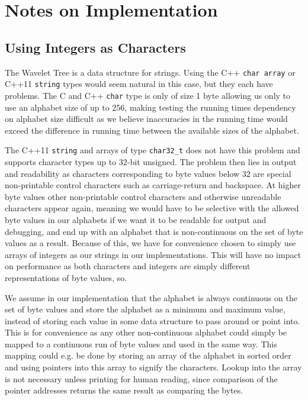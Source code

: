\section{Notes on Implementation}

\subsection{Using Integers as Characters}
\label{sec:UsingIntAsChar}
The Wavelet Tree is a data structure for strings. 
Using the C++ \texttt{char array} or C++11 \texttt{string} types would seem natural in this case, but they each have problems.
The C and C++ \texttt{char} type is only of size 1 byte allowing us only to use an alphabet size of up to 256, making testing the running times dependency on alphabet size difficult as we believe inaccuracies in the running time would exceed the difference in running time between the available sizes of the alphabet.

The C++11 \texttt{string} and arrays of type \texttt{char32\_t} does not have this problem and supports character types up to 32-bit unsigned. 
The problem then lies in output and readability as characters corresponding to byte values below 32 are special non-printable control characters such as carriage-return and backspace. 
At higher byte values other non-printable control characters and otherwise unreadable characters appear again, meaning we would have to be selective with the allowed byte values in our alphabets if we want it to be readable for output and debugging, and end up with an alphabet that is non-continuous on the set of byte values as a result.
Because of this, we have for convenience chosen to simply use arrays of integers as our strings in our implementations.
This will have no impact on performance as both characters and integers are simply different representations of byte values, so.

We assume in our implementation that the alphabet is always continuous on the set of byte values and store the alphabet as a minimum and maximum value, instead of storing each value in some data structure to pass around or point into.
This is for convenience as any other non-continuous alphabet could simply be mapped to a continuous run of byte values and used in the same way. 
This mapping could e.g. be done by storing an array of the alphabet in sorted order and using pointers into this array to signify the characters. 
Lookup into the array is not necessary unless printing for human reading, since comparison of the pointer addresses returns the same result as comparing the bytes.

